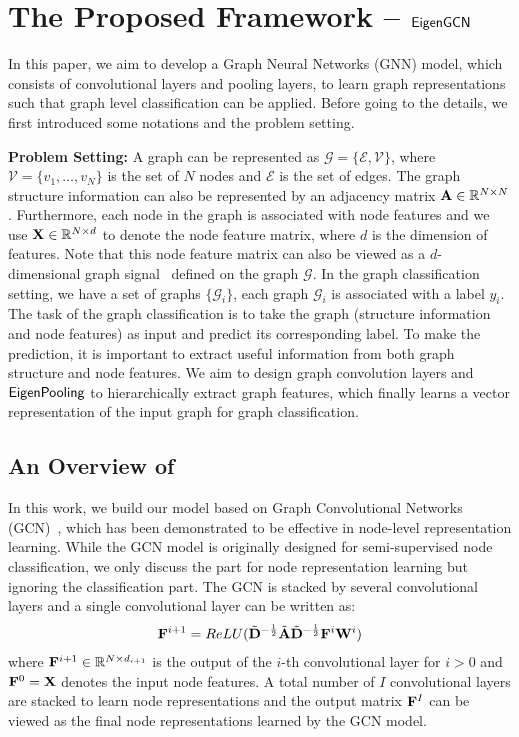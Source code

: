 \documentclass[sigconf]{acmart}
\newcommand{\m}{{\sf {EigenGCN}}}
\newcommand{\pooling}{{\sf {EigenPooling}}}
\begin{document}
 \section{The Proposed Framework -- $\m$} \label{sec:proposed} 

In this paper, we aim to develop a Graph Neural Networks (GNN) model, which consists of convolutional layers and pooling layers, to learn graph representations such that graph level classification can be applied. Before going to the details, we first introduced some notations and the problem setting. 

\vspace{0.5em}
\noindent{}\textbf{Problem Setting:} A graph can be represented as $\mathcal{G} =\{\mathcal{E},\mathcal{V}\}$, where $\mathcal{V} = \{v_1,\dots, v_N\}$ is the set of $N$ nodes and $\mathcal{E}$ is the set of edges. The graph structure information can also be represented by an adjacency matrix ${\bf A}\in \mathbb{R}^{N\times N}$. Furthermore, each node in the graph is associated with node features and we use ${\bf X}\in \mathbb{R}^{N\times d}$ to denote the node feature matrix, where $d$ is the dimension of features. Note that this node feature matrix can also be viewed as a $d$-dimensional graph signal~\cite{shuman2013emerging} defined on the graph $\mathcal{G}$. In the graph classification setting, we have a set of graphs $\{\mathcal{G}_i\}$, each graph $\mathcal{G}_i$ is associated with a label $y_i$. The task of the graph classification is to take the graph (structure information and node features) as input and predict its corresponding label. To make the prediction, it is important to extract useful information from both graph structure and node features. We aim to design graph convolution layers and $\pooling$ to hierarchically extract graph features, which finally learns a vector representation of the input graph for graph classification. 


\subsection{An Overview of \m}
In this work, we build our model based on Graph Convolutional Networks (GCN)~\cite{kipf2016semi}, which has been demonstrated to be effective in node-level representation learning. While the GCN model is originally designed for semi-supervised node classification, we only discuss the part for node representation learning but ignoring the classification part. The GCN is stacked by several convolutional layers and a single convolutional layer can be written as:
\begin{align}
    {\bf F}^{i+1} = ReLU(\tilde{\bf D}^{-\frac{1}{2}}\tilde{\bf A} \tilde{\bf D}^{-\frac{1}{2}} {\bf F}^{i} {\bf W}^{i})
\end{align}
where ${\bf F}^{i+1}\in \mathbb{R}^{N\times d_{i+1}}$ is the output of the $i$-th convolutional layer for $i>0$ and ${\bf F}^{0} = {\bf X}$ denotes the input node features. A total number of $I$ convolutional layers are stacked to learn node representations and the output matrix ${\bf F}^{I}$ can be viewed as the final node representations learned by the GCN model. 
\end{document}
